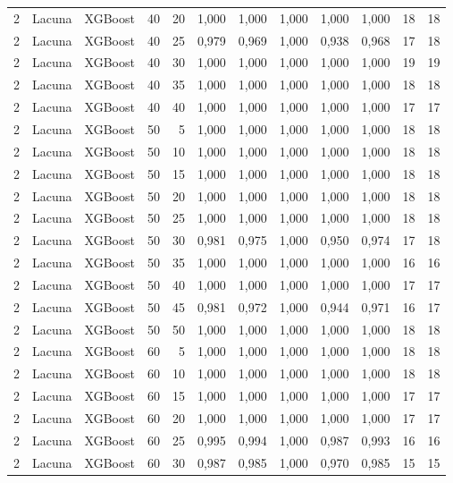 \begin{longtable}{@{}rllrrrrrrrrr@{}}
2 & Lacuna & XGBoost & 40 & 20 & 1,000 & 1,000 & 1,000 & 1,000 & 1,000 & 18 & 18 \\
2 & Lacuna & XGBoost & 40 & 25 & 0,979 & 0,969 & 1,000 & 0,938 & 0,968 & 17 & 18 \\
2 & Lacuna & XGBoost & 40 & 30 & 1,000 & 1,000 & 1,000 & 1,000 & 1,000 & 19 & 19 \\
2 & Lacuna & XGBoost & 40 & 35 & 1,000 & 1,000 & 1,000 & 1,000 & 1,000 & 18 & 18 \\
2 & Lacuna & XGBoost & 40 & 40 & 1,000 & 1,000 & 1,000 & 1,000 & 1,000 & 17 & 17 \\
2 & Lacuna & XGBoost & 50 & 5 & 1,000 & 1,000 & 1,000 & 1,000 & 1,000 & 18 & 18 \\
2 & Lacuna & XGBoost & 50 & 10 & 1,000 & 1,000 & 1,000 & 1,000 & 1,000 & 18 & 18 \\
2 & Lacuna & XGBoost & 50 & 15 & 1,000 & 1,000 & 1,000 & 1,000 & 1,000 & 18 & 18 \\
2 & Lacuna & XGBoost & 50 & 20 & 1,000 & 1,000 & 1,000 & 1,000 & 1,000 & 18 & 18 \\
2 & Lacuna & XGBoost & 50 & 25 & 1,000 & 1,000 & 1,000 & 1,000 & 1,000 & 18 & 18 \\
2 & Lacuna & XGBoost & 50 & 30 & 0,981 & 0,975 & 1,000 & 0,950 & 0,974 & 17 & 18 \\
2 & Lacuna & XGBoost & 50 & 35 & 1,000 & 1,000 & 1,000 & 1,000 & 1,000 & 16 & 16 \\
2 & Lacuna & XGBoost & 50 & 40 & 1,000 & 1,000 & 1,000 & 1,000 & 1,000 & 17 & 17 \\
2 & Lacuna & XGBoost & 50 & 45 & 0,981 & 0,972 & 1,000 & 0,944 & 0,971 & 16 & 17 \\
2 & Lacuna & XGBoost & 50 & 50 & 1,000 & 1,000 & 1,000 & 1,000 & 1,000 & 18 & 18 \\
2 & Lacuna & XGBoost & 60 & 5 & 1,000 & 1,000 & 1,000 & 1,000 & 1,000 & 18 & 18 \\
2 & Lacuna & XGBoost & 60 & 10 & 1,000 & 1,000 & 1,000 & 1,000 & 1,000 & 18 & 18 \\
2 & Lacuna & XGBoost & 60 & 15 & 1,000 & 1,000 & 1,000 & 1,000 & 1,000 & 17 & 17 \\
2 & Lacuna & XGBoost & 60 & 20 & 1,000 & 1,000 & 1,000 & 1,000 & 1,000 & 17 & 17 \\
2 & Lacuna & XGBoost & 60 & 25 & 0,995 & 0,994 & 1,000 & 0,987 & 0,993 & 16 & 16 \\
2 & Lacuna & XGBoost & 60 & 30 & 0,987 & 0,985 & 1,000 & 0,970 & 0,985 & 15 & 15 \\

\end{longtable}
